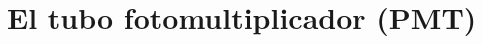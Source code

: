 \documentclass{beamer}
\begin{document}
%
%

\section{El tubo fotomultiplicador (PMT)}

\begin{frame}
\begin{center}
\Huge{\color{blue}{El tubo fotomultiplicador (PMT)}}
\end{center}
\end{frame}
\end{document}
